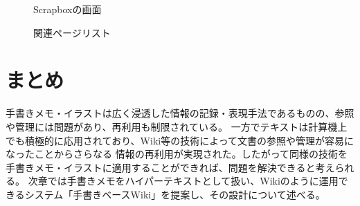 \begin{figure}[htbp] \begin{minipage}{0.5\hsize}
                         \begin{center} 
                         \end{center} \caption{Scrapboxの画面} \label{fig:scrapbox1}
\end{minipage} \begin{minipage}{0.5\hsize}
                   \begin{center} 
                   \end{center} \caption{関連ページリスト} \label{fig:scrapbox2}
\end{minipage}
\end{figure}


\section{まとめ}
手書きメモ・イラストは広く浸透した情報の記録・表現手法であるものの、参照や管理には問題があり、再利用も制限されている。
一方でテキストは計算機上でも積極的に応用されており、Wiki等の技術によって文書の参照や管理が容易になったことからさらなる
情報の再利用が実現された。したがって同様の技術を手書きメモ・イラストに適用することができれば、問題を解決できると考えられる。
次章では手書きメモをハイパーテキストとして扱い、Wikiのように運用できるシステム「手書きベースWiki」を提案し、その設計について述べる。

